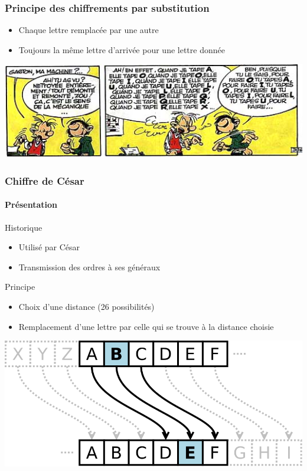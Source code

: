 \documentclass[xcolor={dvipsnames}]{beamer}
\begin{document}
\begin{frame}
\frametitle{Principe des chiffrements par substitution}

\begin{itemize}
	\item Chaque lettre remplacée par une autre
	\item Toujours la même lettre d'arrivée pour une lettre donnée
\end{itemize}

\begin{center}
	\includegraphics[scale=0.6]{gaston}
\end{center}
\end{frame}




\begin{frame}
	\frametitle{Chiffre de César}
	\framesubtitle{Présentation}
	
	\begin{block}{Historique}
		\begin{itemize}
			\item Utilisé par César 
			\item Transmission des ordres à ses généraux 
		\end{itemize}
	\end{block}
	
	\begin{block}{Principe}
		\begin{itemize}
			\item Choix d'une distance (26 possibilités)
			\item Remplacement d'une lettre par celle qui se trouve à la distance choisie   
		\end{itemize}
		
		\begin{center}
			\includegraphics[scale=0.2]{cesar}			
		\end{center}
		
	\end{block}
	
\end{frame}
\end{document}

